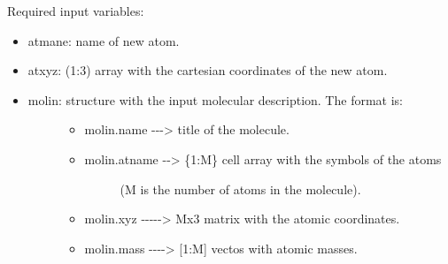 \documentclass[a4paper]{article}
\begin{document}
Required input variables:
%
\begin{itemize}

\item atmane: name of new atom.

\item atxyz: (1:3) array with the cartesian coordinates of the new atom.

\item %
\begin{description}
\item[{molin: structure with the input molecular description. The format is:}] \leavevmode %
\begin{itemize}

\item molin.name -{}-{}-> title of the molecule.

\item %
\begin{description}
\item[{molin.atname -{}-> \{1:M\} cell array with the symbols of the atoms}] \leavevmode 
(M is the number of atoms in the molecule).

\end{description}

\item molin.xyz -{}-{}-{}-{}-> Mx3 matrix with the atomic coordinates.

\item molin.mass -{}-{}-{}-> {[}1:M{]} vectos with atomic masses.

\end{itemize}

\end{description}

\end{itemize}
\end{document}
